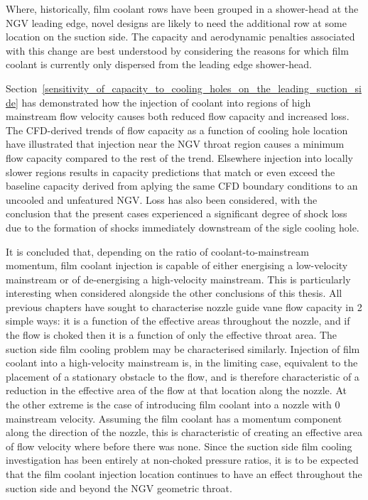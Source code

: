 \documentclass[a4paper, 11pt, oneside]{report}
\begin{document}
Where, historically, film coolant rows have been grouped in a shower-head at the NGV leading edge, novel designs are likely to need the additional row at some location on the suction side. The capacity and aerodynamic penalties associated with this change are best understood by considering the reasons for which film coolant is currently only dispersed from the leading edge shower-head.

Section~\ref{sensitivity_of_capacity_to_cooling_holes_on_the_leading_suction_side} has demonstrated how the injection of coolant into regions of high mainstream flow velocity causes both reduced flow capacity and increased loss. The CFD-derived trends of flow capacity as a function of cooling hole location have illustrated that injection near the NGV throat region causes a minimum flow capacity compared to the rest of the trend. Elsewhere injection into locally slower regions results in capacity predictions that match or even exceed the baseline capacity derived from aplying the same CFD boundary conditions to an uncooled and unfeatured NGV. Loss has also been considered, with the conclusion that the present cases experienced a significant degree of shock loss due to the formation of shocks immediately downstream of the sigle cooling hole. 

\newpage
It is concluded that, depending on the ratio of coolant-to-mainstream momentum, film coolant injection is capable of either energising a low-velocity mainstream or of de-energising a high-velocity mainstream. This is particularly interesting when considered alongside the other conclusions of this thesis. All previous chapters have sought to characterise nozzle guide vane flow capacity in 2 simple ways: it is a function of the effective areas throughout the nozzle, and if the flow is choked then it is a function of only the effective throat area. The suction side film cooling problem may be characterised similarly. Injection of film coolant into a high-velocity mainstream is, in the limiting case, equivalent to the placement of a stationary obstacle to the flow, and is therefore characteristic of a reduction in the effective area of the flow at that location along the nozzle. At the other extreme is the case of introducing film coolant into a nozzle with $0$ mainstream velocity. Assuming the film coolant has a momentum component along the direction of the nozzle, this is characteristic of creating an effective area of flow velocity where before there was none. Since the suction side film cooling investigation has been entirely at non-choked pressure ratios, it is to be expected that the film coolant injection location continues to have an effect throughout the suction side and beyond the NGV geometric throat.
\end{document}
